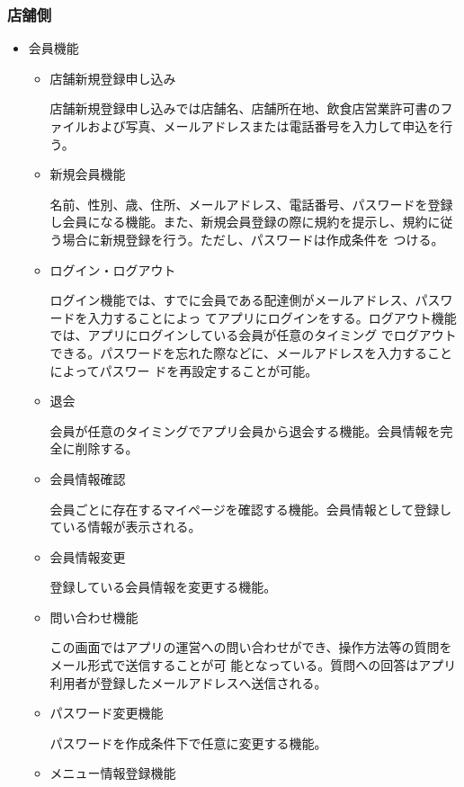 \subsubsection{店舗側}

\begin{itemize}
  \item 会員機能
    \begin{itemize}
        \item 店舗新規登録申し込み
        
        店舗新規登録申し込みでは店舗名、店舗所在地、飲食店営業許可書のファイルおよび写真、メールアドレスまたは電話番号を入力して申込を行う。

        \item 新規会員機能
        
        名前、性別、歳、住所、メールアドレス、電話番号、パスワードを登録し会員になる機能。また、新規会員登録の際に規約を提示し、規約に従う場合に新規登録を行う。ただし、パスワードは作成条件を つける。
        \item ログイン・ログアウト
        
        ログイン機能では、すでに会員である配達側がメールアドレス、パスワードを入力することによっ てアプリにログインをする。ログアウト機能では、アプリにログインしている会員が任意のタイミング でログアウトできる。パスワードを忘れた際などに、メールアドレスを入力することによってパスワー ドを再設定することが可能。
        \item 退会
        
        会員が任意のタイミングでアプリ会員から退会する機能。会員情報を完全に削除する。
        \item 会員情報確認
        
        会員ごとに存在するマイページを確認する機能。会員情報として登録している情報が表示される。
        \item 会員情報変更
        
        登録している会員情報を変更する機能。
        \item 問い合わせ機能
        
        この画面ではアプリの運営への問い合わせができ、操作方法等の質問をメール形式で送信することが可 能となっている。質問への回答はアプリ利用者が登録したメールアドレスへ送信される。
        \item パスワード変更機能
        
        パスワードを作成条件下で任意に変更する機能。
        \item メニュー情報登録機能
        

\end{itemize}
\end{itemize}
